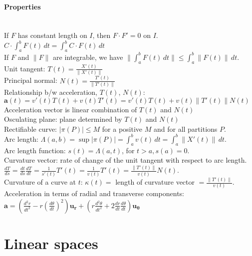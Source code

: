 \documentclass[10pt]{article}
\begin{document}
\paragraph{Properties}\ \\
If $F$ has constant length on $I$, then $F\cdot F' = 0$ on $I$.\\
$C\cdot \int_a^bF(t)\,dt = \int_a^b C\cdot F(t)\,dt$\\
If $F$ and $\lVert F\rVert$ are integrable, we have $\lVert\int_a^bF(t)\,dt\rVert\leq\int_a^b\lVert F(t)\rVert\,dt$.\\
Unit tangent: $T(t)=\frac{X'(t)}{\lVert X'(t)\rVert}$\\
Principal normal: $N(t) = \frac{T'(t)}{\lVert T'(t)\rVert}$\\
Relationship b/w acceleration, $T(t)$, $N(t)$: $\pmb{a}(t)=v'(t)T(t)+v(t)T'(t) 
= v'(t)T(t)+v(t)\lVert T'(t)\rVert N(t)$\\
Acceleration vector is linear combination of $T(t)$ and $N(t)$\\
Osculating plane: plane determined by $T(t)$ and $N(t)$\\
Rectifiable curve: $|\pi(P)|\leq M$ for a positive $M$ and for all partitions $P$.\\
Arc length: $\Lambda(a,b) = \sup |\pi(P)| = \int_a^bv(t)\,dt = \int_a^b\lVert X'(t)\rVert\,dt$.\\
Arc length function: $s(t)=\Lambda(a,t)$, for $t>a, s(a) = 0$.\\
Curvature vector: rate of change of the unit tangent with respect to arc length.\\
$\frac{dT}{ds}=\frac{dt}{ds}\frac{dT}{dt}=\frac{1}{s'(t)}T'(t)=\frac{1}{v(t)}T'(t) 
=\frac{\lVert T'(t)\rVert}{v(t)}N(t)$.\\
Curvature of a curve at $t$: $\kappa(t)=$ length of curvature vector $= \frac{\lVert T'(t)\rVert}{v(t)}$.\\
Acceleration in terms of radial and transverse components:
$\pmb{a}=\left(\frac{d^2r}{dt^2}-r\left(\frac{d\theta}{dt}\right)^2\right)\pmb{u_r}
+ \left(r\frac{d^2\theta}{dt^2}+2\frac{dr}{dt}\frac{d\theta}{dt}\right)\pmb{u_\theta}$



\bigskip\bigskip
\section{Linear spaces}\smallskip
\end{document}
